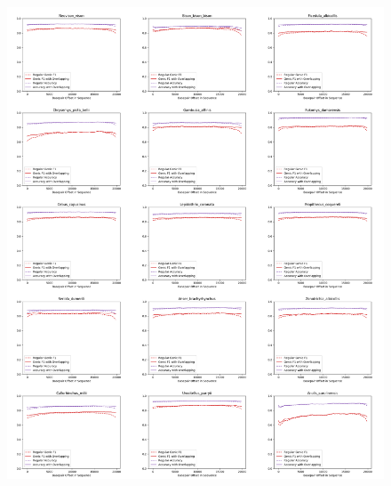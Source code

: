 \documentclass{article}
\begin{document}
\begin{figure}[!h]
\centerline{\includegraphics[width=\overlapscale\textwidth]{images/overlapping/montage_animals8}}
\end{figure}
\end{document}

